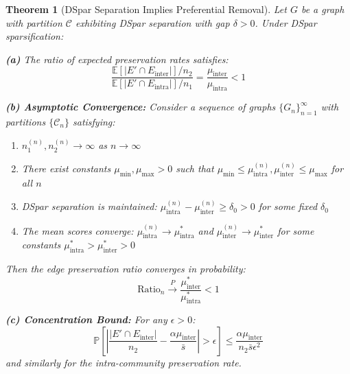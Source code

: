 \documentclass[10pt,journal,compsoc]{IEEEtran}
\newtheorem{theorem}{Theorem}
\begin{document}
\begin{theorem}[DSpar Separation Implies Preferential Removal]
\label{thm:ratio}
Let $G$ be a graph with partition $\mathcal{C}$ exhibiting DSpar separation with gap $\delta > 0$. Under DSpar sparsification:

\textbf{(a)} The ratio of expected preservation rates satisfies:
\begin{equation}
\frac{\mathbb{E}[|E' \cap E_{\text{inter}}|] / n_2}{\mathbb{E}[|E' \cap E_{\text{intra}}|] / n_1} = \frac{\mu_{\text{inter}}}{\mu_{\text{intra}}} < 1
\end{equation}

\textbf{(b) Asymptotic Convergence:} Consider a sequence of graphs $\{G_n\}_{n=1}^\infty$ with partitions $\{\mathcal{C}_n\}$ satisfying:
\begin{enumerate}
    \item[(i)] $n_1^{(n)}, n_2^{(n)} \to \infty$ as $n \to \infty$
    \item[(ii)] There exist constants $\mu_{\min}, \mu_{\max} > 0$ such that $\mu_{\min} \leq \mu_{\text{intra}}^{(n)}, \mu_{\text{inter}}^{(n)} \leq \mu_{\max}$ for all $n$
    \item[(iii)] DSpar separation is maintained: $\mu_{\text{intra}}^{(n)} - \mu_{\text{inter}}^{(n)} \geq \delta_0 > 0$ for some fixed $\delta_0$
    \item[(iv)] The mean scores converge: $\mu_{\text{intra}}^{(n)} \to \mu_{\text{intra}}^*$ and $\mu_{\text{inter}}^{(n)} \to \mu_{\text{inter}}^*$ for some constants $\mu_{\text{intra}}^* > \mu_{\text{inter}}^* > 0$
\end{enumerate}
Then the edge preservation ratio converges in probability:
\begin{equation}
\text{Ratio}_n \xrightarrow{P} \frac{\mu_{\text{inter}}^*}{\mu_{\text{intra}}^*} < 1
\end{equation}

\textbf{(c) Concentration Bound:} For any $\epsilon > 0$:
\begin{equation}
\mathbb{P}\left[ \left| \frac{|E' \cap E_{\text{inter}}|}{n_2} - \frac{\alpha \mu_{\text{inter}}}{\bar{s}} \right| > \epsilon \right] \leq \frac{\alpha \mu_{\text{inter}}}{n_2 \bar{s} \epsilon^2}
\end{equation}
and similarly for the intra-community preservation rate.
\end{theorem}
\end{document}
